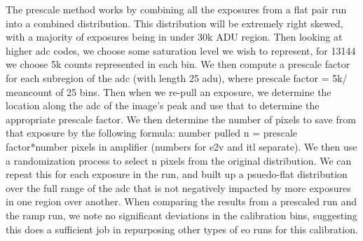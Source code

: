 \documentclass[11pt, letterpaper]{article}
\begin{document}
The prescale method works by combining all the exposures from a flat pair run into a combined distribution. This distribution will be extremely right skewed, with a majority of exposures being in under 30k ADU region. Then looking at higher adc codes, we choose some saturation level we wish to represent, for 13144 we choose 5k counts represented in each bin. We then compute a prescale factor for each subregion of the adc (with length 25 adu), where prescale factor = 5k/ meancount of 25 bins. Then when we re-pull an exposure, we determine the location along the adc of the image's peak and use that to determine the appropriate prescale factor. We then determine the number of pixels to save from that exposure by the following formula: number pulled n = prescale factor*number pixels in amplifier (numbers for e2v and itl separate). We then use a randomization process to select n pixels from the original distribution. We can repeat this for each exposure in the run, and built up a psuedo-flat distribution over the full range of the adc that is not negatively impacted by more exposures in one region over another. When comparing the results from a prescaled run and the ramp run, we note no significant deviations in the calibration bins, suggesting this does a sufficient job in repurposing other types of eo runs for this calibration. 
\end{document}
